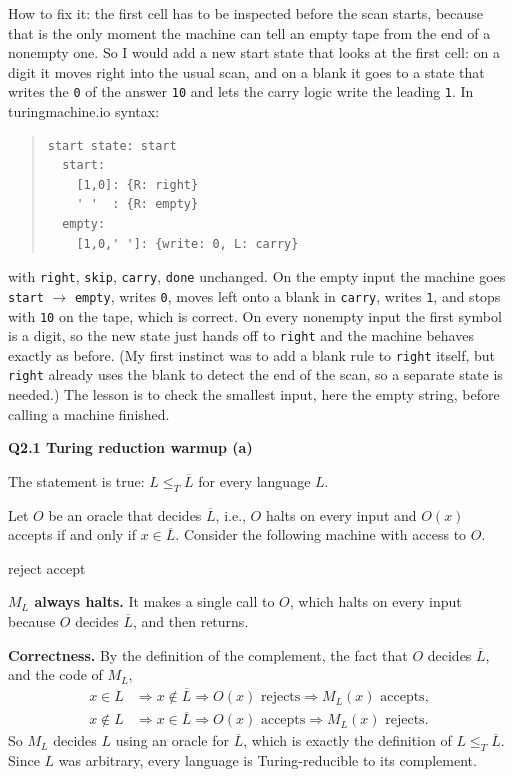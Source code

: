 \documentclass[11pt]{article}
\newcommand{\lT}{\leq_T}
\newcommand{\qpage}[1]{\clearpage\noindent\textbf{\large #1}\par\medskip}
\begin{document}
How to fix it: the first cell has to be inspected before the scan starts, because that is the only moment the machine can tell an empty tape from the end of a nonempty one.
So I would add a new start state that looks at the first cell: on a digit it moves right into the usual scan, and on a blank it goes to a state that writes the \texttt{0} of the answer \texttt{10} and lets the carry logic write the leading \texttt{1}.
In turingmachine.io syntax:
\begin{quote}\small
\begin{verbatim}
start state: start
  start:
    [1,0]: {R: right}
    ' '  : {R: empty}
  empty:
    [1,0,' ']: {write: 0, L: carry}
\end{verbatim}
\end{quote}
with \texttt{right}, \texttt{skip}, \texttt{carry}, \texttt{done} unchanged.
On the empty input the machine goes \texttt{start} $\to$ \texttt{empty}, writes \texttt{0}, moves left onto a blank in \texttt{carry}, writes \texttt{1}, and stops with \texttt{10} on the tape, which is correct.
On every nonempty input the first symbol is a digit, so the new state just hands off to \texttt{right} and the machine behaves exactly as before.
(My first instinct was to add a blank rule to \texttt{right} itself, but \texttt{right} already uses the blank to detect the end of the scan, so a separate state is needed.)
The lesson is to check the smallest input, here the empty string, before calling a machine finished.

\qpage{Q2.1 Turing reduction warmup (a)}

The statement is true: $L \lT \overline{L}$ for every language $L$.

Let $O$ be an oracle that decides $\overline{L}$, i.e., $O$ halts on every input and $O(x)$ accepts if and only if $x \in \overline{L}$.
Consider the following machine with access to $O$.

\begin{algorithmic}[1]
     \Return reject
    \Else{} \Return accept
    \EndIf
  \EndFunction
\end{algorithmic}

\textbf{$M_L$ always halts.}
It makes a single call to $O$, which halts on every input because $O$ decides $\overline{L}$, and then returns.

\textbf{Correctness.}
By the definition of the complement, the fact that $O$ decides $\overline{L}$, and the code of $M_L$,
\begin{align*}
  x \in L &\Longrightarrow x \notin \overline{L} \Longrightarrow O(x) \text{ rejects} \Longrightarrow M_L(x) \text{ accepts}, \\
  x \notin L &\Longrightarrow x \in \overline{L} \Longrightarrow O(x) \text{ accepts} \Longrightarrow M_L(x) \text{ rejects}.
\end{align*}
So $M_L$ decides $L$ using an oracle for $\overline{L}$, which is exactly the definition of $L \lT \overline{L}$.
Since $L$ was arbitrary, every language is Turing-reducible to its complement.
\end{document}
